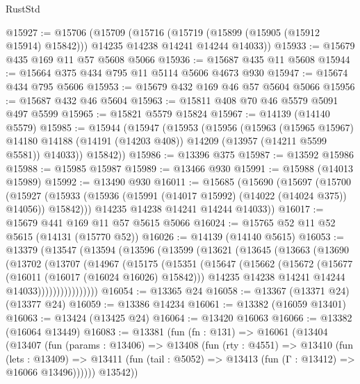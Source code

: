\begin{lexlean}{RustStd}
\begin{coremodule}
@15927 := @15706
    (@15709
      (@15716 (@15719 (@15899 (@15905 (@15912 @15914) @15842))) @14235 @14238 @14241 @14244 @14033))
@15933 := @15679 @435 @169 @11 @57 @5608 @5066
@15936 := @15687 @435 @11 @5608
@15944 := @15664 @375 @434 @795 @11 @5114 @5606 @4673 @930
@15947 := @15674 @434 @795 @5606
@15953 := @15679 @432 @169 @46 @57 @5604 @5066
@15956 := @15687 @432 @46 @5604
@15963 := @15811 @408 @70 @46 @5579 @5091 @497 @5599
@15965 := @15821 @5579 @15824
@15967 := @14139 (@14140 @5579)
@15985 := @15944
    (@15947
      (@15953
        (@15956
          (@15963
            (@15965 @15967)
            @14180
            @14188
            (@14191 (@14203 @408))
            @14209
            (@13957 (@14211 @5599 @5581))
            @14033))
        @15842))
@15986 := @13396 @375
@15987 := @13592 @15986
@15988 := @15985 @15987
@15989 := @13466 @930
@15991 := @15988 (@14013 @15989)
@15992 := @13490 @930
@16011 := @15685
    (@15690
      (@15697
        (@15700
          (@15927 (@15933 (@15936 (@15991 (@14017 @15992) (@14022 (@14024 @375)) @14056)) @15842)))
        @14235
        @14238
        @14241
        @14244
        @14033))
@16017 := @15679 @441 @169 @11 @57 @5615 @5066
@16024 := @15765 @52 @11 @52 @5615 (@14131 (@15770 @52))
@16026 := @14139 (@14140 @5615)
@16053 := @13379
    (@13547
      (@13594
        (@13596
          (@13599
            (@13621
              (@13645
                (@13663
                  (@13690
                    (@13702
                      (@13707
                        (@14967
                          (@15175
                            (@15351
                              (@15647
                                (@15662
                                  (@15672
                                    (@15677 (@16011 (@16017 (@16024 @16026) @15842)))
                                    @14235
                                    @14238
                                    @14241
                                    @14244
                                    @14033))))))))))))))))
@16054 := @13365 @24
@16058 := @13367 (@13371 @24) (@13377 @24)
@16059 := @13386 @14234
@16061 := @13382 (@16059 @13401)
@16063 := @13424 (@13425 @24)
@16064 := @13420 @16063
@16066 := @13382 (@16064 @13449)
@16083 := @13381
    (fun (fn : @131) =>
    @16061
      (@13404
        (@13407
          (fun (params : @13406) =>
          @13408
            (fun (rty : @4551) =>
            @13410
              (fun (lets : @13409) =>
              @13411 (fun (tail : @5052) => @13413 (fun (Γ : @13412) => @16066 @13496))))))
        @13542))

\end{coremodule}
\end{lexlean}
